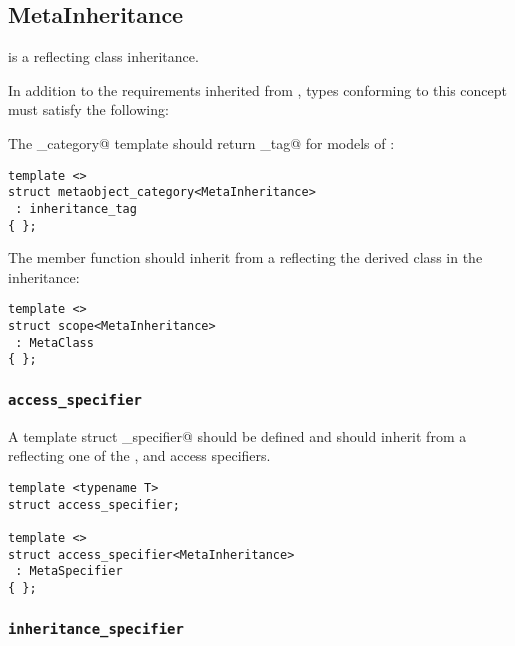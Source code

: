 \subsection{MetaInheritance}
\label{concept-MetaInheritance}


 is a  reflecting class inheritance.

In addition to the requirements inherited from , types conforming to this concept
must satisfy the following:

The \verb@metaobject_category@ template should return \verb@inheritance_tag@ for models
of :

\begin{verbatim}
template <>
struct metaobject_category<MetaInheritance>
 : inheritance_tag
{ };
\end{verbatim}

The \verb@scope@ member function should inherit from a  reflecting
the derived class in the inheritance:

\begin{verbatim}
template <>
struct scope<MetaInheritance>
 : MetaClass
{ };
\end{verbatim}

\subsubsection{\texttt{access\_specifier}}

A template struct \verb@access_specifier@ should be defined and should inherit from
a  reflecting one of the \verb@private@, \verb@protected@ and
\verb@public@ access specifiers.

\begin{verbatim}
template <typename T>
struct access_specifier;

template <>
struct access_specifier<MetaInheritance>
 : MetaSpecifier
{ };
\end{verbatim}

\subsubsection{\texttt{inheritance\_specifier}}

